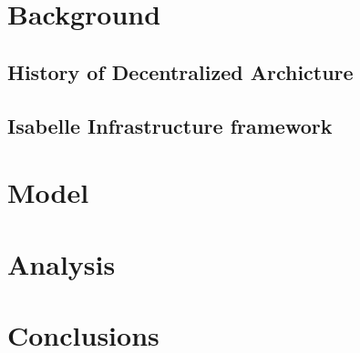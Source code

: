\documentclass{llncs}
\begin{document}
\section{Background}
\label{sec:background}

\subsection{History of Decentralized Archicture}
\label{sec:history}

\subsection{Isabelle Infrastructure framework}
\label{sec:isainf}


\section{Model}
\label{sec:model}

\section{Analysis}
\label{sec:ana}

\section{Conclusions}
\label{sec:concl}



\end{document}
